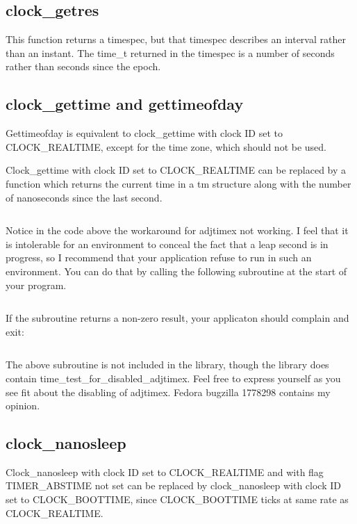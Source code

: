 \documentclass[letterpaper,twoside]{article}
\begin{document}
\subsection{clock\_getres}
This function returns a timespec, but that timespec describes an interval
rather than an instant.  The {\ttfamily time\_t} returned in the timespec is a
number of seconds rather than seconds since the epoch.

\subsection{clock\_gettime and gettimeofday}
Gettimeofday is equivalent to clock\_gettime with clock ID set to
CLOCK\_REAL\-TIME, except for the time zone, which should not be used.

Clock\_gettime with clock ID set to CLOCK\_REAL\-TIME can be replaced by
a function which returns the current time in a {\ttfamily tm} structure along
with the number of nanoseconds since the last second.
\inputminted[firstline=34]{c}{src/time_current_tm_nano.c}

Notice in the code above the workaround for {\ttfamily adjtimex}
not working.  I feel that it is intolerable for an environment to
conceal the fact that a leap second is in progress, so I recommend
that your application refuse to run in such an environment.  You
can do that by calling the following subroutine at the start
of your program.
\inputminted[firstline=36]{c}{src/time_test_for_disabled_adjtimex.c}
If the subroutine returns a non-zero result, your applicaton should
complain and exit:
\inputminted[firstline=47,lastline=67]{c}{tests/test_for_disabled_adjtimex.c}
The above subroutine is not included in the library, though
the library does contain
{\ttfamily time\_test\_for\_disabled\_adjtimex}.
Feel free to express yourself as you see fit about the disabling
of {\ttfamily adjtimex}.  Fedora bugzilla \num{1778298} contains my
opinion.

\subsection{clock\_nanosleep}
Clock\_nanosleep with clock ID set to CLOCK\_REAL\-TIME and with flag
TIMER\_ABS\-TIME not set can be replaced by clock\_nanosleep with
clock ID set to CLOCK\_BOOTTIME, since CLOCK\_BOOTTIME ticks at
same rate as CLOCK\_REAL\-TIME.
\end{document}
